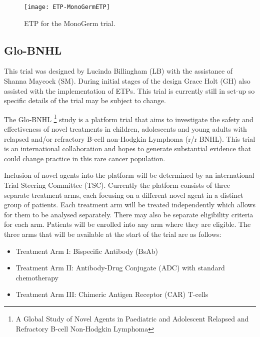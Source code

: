 \begin{sidewaysfigure}[h!]
	\centering
	\caption{ETP for the MonoGerm trial.}
	\label{fig_etp:MonoGermETP}
	\texttt{[image: ETP-MonoGermETP]}
\end{sidewaysfigure} 

\clearpage


\subsection{Glo-BNHL}

This trial was designed by Lucinda Billingham (LB) with the assistance of Shanna Maycock (SM). During initial stages of the design Grace Holt (GH) also assisted with the implementation of ETPs. This trial is currently still in set-up so specific details of the trial may be subject to change.   

The Glo-BNHL \footnote{A Global Study of Novel Agents in Paediatric and Adolescent Relapsed and Refractory B-cell Non-Hodgkin Lymphoma} study is a platform trial that aims to investigate the safety and effectiveness of novel treatments in children, adolescents and young adults with relapsed and/or refractory B-cell non-Hodgkin Lymphoma (r/r BNHL). This trial is an international collaboration and hopes to generate substantial evidence that could change practice in this rare cancer population. 

Inclusion of novel agents into the platform will be determined by an international Trial Steering Committee (TSC). Currently the platform consists of three separate treatment arms, each focusing on a different novel agent in a distinct group of patients. Each treatment arm will be treated independently which allows for them to be analysed separately. There may also be separate eligibility criteria for each arm. Patients will be enrolled into any arm where they are eligible. The three arms that will be available at the start of the trial are as follows: 

\begin{itemize}
	\item Treatment Arm \RN{1}: Bispecific Antibody (BsAb)
	\item Treatment Arm \RN{2}: Antibody-Drug Conjugate (ADC) with standard \\ chemotherapy
	\item Treatment Arm \RN{3}: Chimeric Antigen Receptor (CAR) T-cells
\end{itemize}

